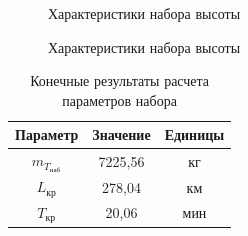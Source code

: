 \begin{figure}[H]
    \caption{Характеристики набора высоты}
    \label{fig:Характеристики набора высоты1}
\end{figure}

\begin{figure}[H]
    \caption{Характеристики набора высоты}
    \label{fig:Характеристики набора высоты2}
\end{figure}

\begin{table}[H]
    \centering
    \caption{Конечные результаты расчета параметров набора}
    \begin{tabular}{|c|c|c|}
    \hline
        Параметр & Значение &Единицы\\ \hline
        $m_{T_\text{наб}}$ & 7225,56& кг\\ \hline
        $L_\text{кр}$ & 278,04 &км\\ \hline
        $T_\text{кр}$ & 20,06& мин\\ \hline
    \end{tabular}
    \label{tab:Крейсер}
\end{table}


